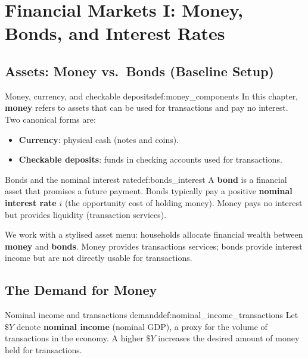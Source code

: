 
\section{Financial Markets I: Money, Bonds, and Interest Rates}

\subsection{Assets: Money vs.\ Bonds (Baseline Setup)}

\begin{definition}{Money, currency, and checkable deposits}{def:money_components}
In this chapter, \textbf{money} refers to assets that can be used for transactions and pay no interest.
Two canonical forms are:
\begin{itemize}
  \item \textbf{Currency}: physical cash (notes and coins).
  \item \textbf{Checkable deposits}: funds in checking accounts used for transactions.
\end{itemize}
\end{definition}

\begin{definition}{Bonds and the nominal interest rate}{def:bonds_interest}
A \textbf{bond} is a financial asset that promises a future payment. Bonds typically pay a positive \textbf{nominal interest rate} $i$ (the opportunity cost of holding money).
Money pays no interest but provides liquidity (transaction services).
\end{definition}

\noindent
We work with a stylised asset menu: households allocate financial wealth between \textbf{money} and \textbf{bonds}.
Money provides transactions services; bonds provide interest income but are not directly usable for transactions.

\subsection{The Demand for Money}

\begin{definition}{Nominal income and transactions demand}{def:nominal_income_transactions}
Let $\$Y$ denote \textbf{nominal income} (nominal GDP), a proxy for the volume of transactions in the economy.
A higher $\$Y$ increases the desired amount of money held for transactions.
\end{definition}

